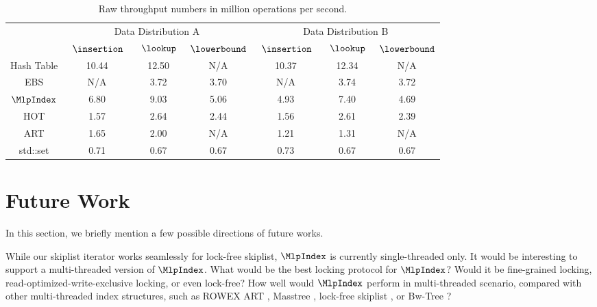 \documentclass[11pt, usletter]{article}
\begin{document}
\begin{table}[!htb]
\centering
\begin{tabular}{|c|c|c|c|c|c|c|}
\hline
\multirow{2}{*}{} & \multicolumn{3}{c|}{Data Distribution A} & \multicolumn{3}{c|}{Data Distribution B} \\ \cline{2-7} 
                                                                             & \ $\insertion\ $   & \ $\lookup\ $   & $\lowerbound$   & \ $\insertion\ $   & \ $\lookup\ $   & $\lowerbound$   \\ \hline
Hash Table                                                                    & 10.44        & 12.50     & N/A           & 10.37        & 12.34     & N/A           \\ \hline
EBS                                                                          & N/A          & 3.72     & 3.70           & N/A          & 3.74      & 3.72           \\ \hline
$\MlpIndex$                                                                    & 6.80         & 9.03      & 5.06          & 4.93         & 7.40      & 4.69          \\ \hline
HOT                                                                          & 1.57         & 2.64      & 2.44          & 1.56         & 2.61      & 2.39          \\ \hline
ART                                                                          & 1.65         & 2.00      & N/A           & 1.21         & 1.31      & N/A           \\ \hline
std::set                                                                     & 0.71         & 0.67      & 0.67           & 0.73        & 0.67      & 0.67           \\ \hline
\end{tabular}
\caption{Raw throughput numbers in million operations per second.}
\label{mlpindex_results}
\end{table}

\section{Future Work} \label{futureworks}

In this section, we briefly mention a few possible directions of future works. 

While our skiplist iterator works seamlessly for lock-free skiplist, 
$\MlpIndex$ is currently single-threaded only. 
It would be interesting to support a multi-threaded version of $\MlpIndex$.
What would be the best locking protocol for $\MlpIndex$? 
Would it be fine-grained locking, read-optimized-write-exclusive locking, or even lock-free?
How well would $\MlpIndex$ perform in multi-threaded scenario, 
compared with other multi-threaded index structures, such as ROWEX ART \cite{art_sync}, Masstree \cite{masstree},
lock-free skiplist \cite{lockfree_skiplist}, or Bw-Tree \cite{bwtree}?
\end{document}
